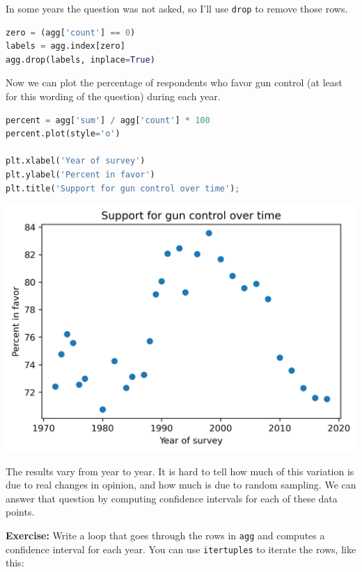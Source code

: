 In some years the question was not asked, so I'll use
\passthrough{\lstinline!drop!} to remove those rows.

\begin{lstlisting}[language=Python,style=source]
zero = (agg['count'] == 0)
labels = agg.index[zero]
agg.drop(labels, inplace=True)
\end{lstlisting}

Now we can plot the percentage of respondents who favor gun control (at
least for this wording of the question) during each year.

\begin{lstlisting}[language=Python,style=source]
percent = agg['sum'] / agg['count'] * 100
percent.plot(style='o')

plt.xlabel('Year of survey')
plt.ylabel('Percent in favor')
plt.title('Support for gun control over time');
\end{lstlisting}

\begin{center}
\includegraphics[scale=0.75]{11_resampling_files/11_resampling_94_0.png}
\end{center}

The results vary from year to year. It is hard to tell how much of this
variation is due to real changes in opinion, and how much is due to
random sampling. We can answer that question by computing confidence
intervals for each of these data points.

\textbf{Exercise:} Write a loop that goes through the rows in
\passthrough{\lstinline!agg!} and computes a confidence interval for
each year. You can use \passthrough{\lstinline!itertuples!} to iterate
the rows, like this:

